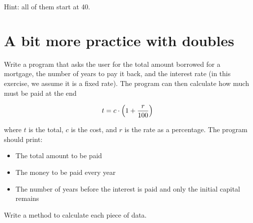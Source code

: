 \documentclass{article}
\begin{document}
Hint: all of them start at 40.

\section{A bit more practice with doubles}
\label{sec:bit-more-practice}

Write a program that asks the user for the total amount borrowed for a
mortgage, the number of years to pay it back, and the interest rate
(in this exercise, we assume it is a fixed 
rate). The program can then calculate how much must be paid at the end

$$t = c \cdot \left(1+ {r \over 100}\right)$$

where $t$ is the total, $c$ is the cost,
and $r$ is the rate as a percentage. The program should print: 

\begin{itemize}
\item The total amount to be paid
\item The money to be paid every year
\item The number of years before the interest is paid and only the
  initial capital remains
\end{itemize}

Write a method to calculate each piece of data. 

%



\end{document}
